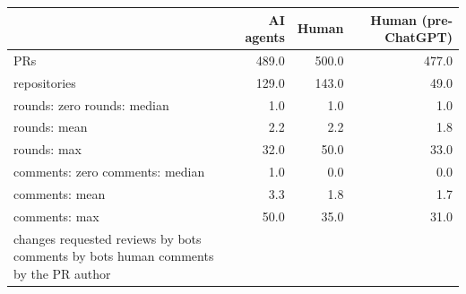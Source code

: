\begin{tabular}{lrrr}
\toprule
 & AI agents & Human & Human (pre-ChatGPT) \\
\midrule
PRs & 489.0 & 500.0 & 477.0 \\
repositories & 129.0 & 143.0 & 49.0 \\
rounds: zero %
rounds: median & 1.0 & 1.0 & 1.0 \\
rounds: mean & 2.2 & 2.2 & 1.8 \\
rounds: max & 32.0 & 50.0 & 33.0 \\
comments: zero %
comments: median & 1.0 & 0.0 & 0.0 \\
comments: mean & 3.3 & 1.8 & 1.7 \\
comments: max & 50.0 & 35.0 & 31.0 \\
changes requested %
reviews by bots %
comments by bots %
human comments by the PR author %
\bottomrule
\end{tabular}
